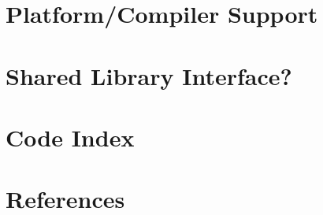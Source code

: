 \documentclass[10pt,a4paper]{scrartcl}
\begin{document}
\clearpage
\begin{appendices}
\section{Platform/Compiler Support}
\section{Shared Library Interface?}
%
\section{Code Index}
\lstlistoflistings%
\section{References}
\printbibliography%
\end{appendices}
\end{document}
